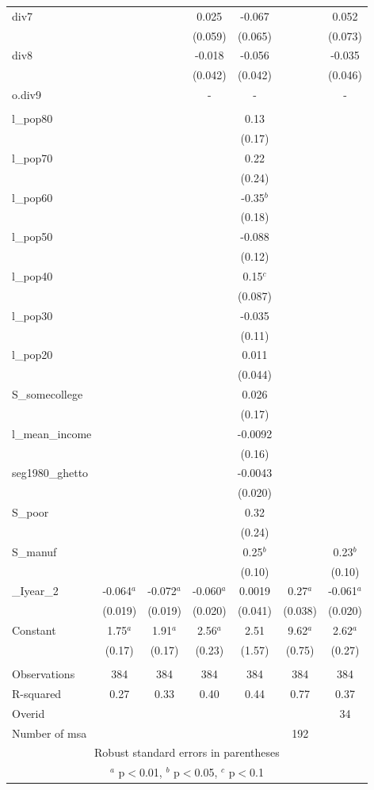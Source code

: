 \documentclass[]{article}
\begin{document}
\begin{tabular}{lcccccc}
div7 &  &  & 0.025 & -0.067 &  & 0.052 \\
 &  &  & (0.059) & (0.065) &  & (0.073) \\
div8 &  &  & -0.018 & -0.056 &  & -0.035 \\
 &  &  & (0.042) & (0.042) &  & (0.046) \\
o.div9 &  &  & - & - &  & - \\
 &  &  &  &  &  &  \\
l\_pop80 &  &  &  & 0.13 &  &  \\
 &  &  &  & (0.17) &  &  \\
l\_pop70 &  &  &  & 0.22 &  &  \\
 &  &  &  & (0.24) &  &  \\
l\_pop60 &  &  &  & -0.35$^b$ &  &  \\
 &  &  &  & (0.18) &  &  \\
l\_pop50 &  &  &  & -0.088 &  &  \\
 &  &  &  & (0.12) &  &  \\
l\_pop40 &  &  &  & 0.15$^c$ &  &  \\
 &  &  &  & (0.087) &  &  \\
l\_pop30 &  &  &  & -0.035 &  &  \\
 &  &  &  & (0.11) &  &  \\
l\_pop20 &  &  &  & 0.011 &  &  \\
 &  &  &  & (0.044) &  &  \\
S\_somecollege &  &  &  & 0.026 &  &  \\
 &  &  &  & (0.17) &  &  \\
l\_mean\_income &  &  &  & -0.0092 &  &  \\
 &  &  &  & (0.16) &  &  \\
seg1980\_ghetto &  &  &  & -0.0043 &  &  \\
 &  &  &  & (0.020) &  &  \\
S\_poor &  &  &  & 0.32 &  &  \\
 &  &  &  & (0.24) &  &  \\
S\_manuf &  &  &  & 0.25$^b$ &  & 0.23$^b$ \\
 &  &  &  & (0.10) &  & (0.10) \\
\_Iyear\_2 & -0.064$^a$ & -0.072$^a$ & -0.060$^a$ & 0.0019 & 0.27$^a$ & -0.061$^a$ \\
 & (0.019) & (0.019) & (0.020) & (0.041) & (0.038) & (0.020) \\
Constant & 1.75$^a$ & 1.91$^a$ & 2.56$^a$ & 2.51 & 9.62$^a$ & 2.62$^a$ \\
 & (0.17) & (0.17) & (0.23) & (1.57) & (0.75) & (0.27) \\
 &  &  &  &  &  &  \\
Observations & 384 & 384 & 384 & 384 & 384 & 384 \\
R-squared & 0.27 & 0.33 & 0.40 & 0.44 & 0.77 & 0.37 \\
Overid &  &  &  &  &  & 34 \\
 Number of msa &  &  &  &  & 192 &  \\ \hline
\multicolumn{7}{c}{ Robust standard errors in parentheses} \\
\multicolumn{7}{c}{ $^a$ p$<$0.01, $^b$ p$<$0.05, $^c$ p$<$0.1} \\
\end{tabular}
\end{document}

